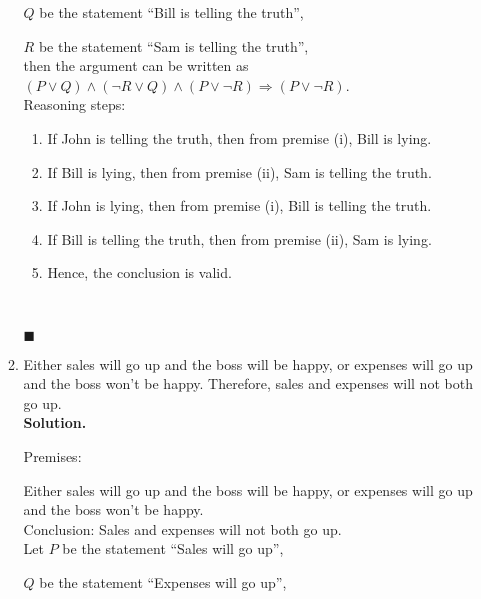 \documentclass{report}
\newcommand{\sol}{\vspace{1em}\\\textbf{Solution.}\vspace{0.5em}}
\newcommand{\qed}{\ \\\strut\hfill$\blacksquare$\vspace{1em}}
\begin{document}
\begin{enumerate}[leftmargin=*]
\begin{enumerate}
                        $Q$ be the statement ``Bill is telling the truth'',

                        $R$ be the statement ``Sam is telling the truth'',\\

                        then the argument can be written as $(P \vee Q) \wedge (\neg R \vee Q) \wedge
                              (P \vee \neg R) \Rightarrow (P \vee \neg R)$.\\

                        Reasoning steps:
                        \begin{enumerate}
                              \item If John is telling the truth, then from premise (i), Bill is lying.

                              \item If Bill is lying, then from premise (ii), Sam is telling the truth.

                              \item If John is lying, then from premise (i), Bill is telling the truth.

                              \item If Bill is telling the truth, then from premise (ii), Sam is lying.

                              \item Hence, the conclusion is valid.
                        \end{enumerate} \qed

                  \item Either sales will go up and the boss will be happy, or expenses will go up and
                        the boss won't be happy. Therefore, sales and expenses will not both go up.
                        \sol{}

                        Premises:

                        Either sales will go up and the boss will be happy, or expenses will go up and
                        the boss won't be happy.\\

                        Conclusion: Sales and expenses will not both go up.\\

                        Let $P$ be the statement ``Sales will go up'',

                        $Q$ be the statement ``Expenses will go up'',


\end{enumerate}
\end{enumerate}
\end{document}
